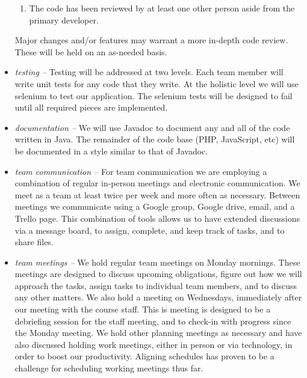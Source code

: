 \documentclass{extarticle}
\begin{document}
\begin{itemize}
\begin{enumerate}
    \item The code has been reviewed by at least one other person aside from the primary developer.
\end{enumerate}
Major changes and/or features may warrant a more in-depth code review. These will be held on an as-needed basis.
\item \emph{testing -- }Testing will be addressed at two levels.  Each team member will write unit tests for any
code that they write.  At the holistic level we will use selenium to test our application.  The selenium tests will
be designed to fail until all required pieces are implemented.
\item \emph{documentation -- }We will use Javadoc to document any and all of the code written in Java.  The
remainder of the code base (PHP, JavaScript, etc) will be documented in a style similar to that of Javadoc.
\item \emph{team communication -- }For team communication we are employing a combination of regular in-person
meetings and electronic communication.  We meet as a team at least twice per week and more often as necessary.
Between meetings we communicate using a Google group, Google drive, email, and a Trello page.  This combination of
tools allows us to have extended discussions via a message board, to assign, complete, and keep track of tasks,
and to share files.
\item \emph{team meetings -- }We hold regular team meetings on Monday mornings.  These meetings are designed to
discuss upcoming obligations, figure out how we will approach the tasks, assign tasks to individual team members,
and to discuss any other matters.  We also hold a meeting on Wednesdays, immediately after our meeting with the
course staff.  This is meeting is designed to be a debriefing session for the staff meeting, and to check-in with
progress since the Monday meeting.  We hold other planning meetings as necessary and have also discussed holding
work meetings, either in person or via technology, in order to boost our productivity.  Aligning schedules has
proven to be a challenge for scheduling working meetings thus far.
\end{itemize}

\newpage
\end{document}
